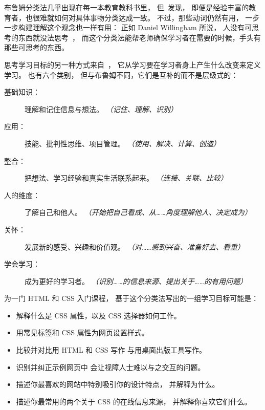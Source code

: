 布鲁姆分类法几乎出现在每一本教育教科书里，
但~\cite{Masa2018}发现，
即便是经验丰富的教育者，也很难就如何对具体事物分类达成一致。
不过，那些动词仍然有用，
一步一步构建理解这个观念也一样有用：
正如 Daniel Willingham 所说，
人没有可思考的东西就没法思考~\cite{Will2010}，
而这个分类法能帮老师确保学习者在需要的时候，手头有那些可思考的东西。

思考学习目标的另一种方式来自~\cite{Fink2013}，
它从学习要在学习者身上产生什么改变来定义学习。
也有六个类别，
但与布鲁姆不同，它们是互补的而不是层级式的：

\begin{description}

\item[基础知识：]
  理解和记住信息与想法。
  \emph{（记住、理解、识别）}

\item[应用：]
  技能、批判性思维、项目管理。
  \emph{（使用、解决、计算、创造）}

\item[整合：]
  把想法、学习经验和真实生活联系起来。
  \emph{（连接、关联、比较）}

\item[人的维度：]
  了解自己和他人。
  \emph{（开始把自己看成、从……角度理解他人、决定成为）}

\item[关怀：]
  发展新的感受、兴趣和价值观。
  \emph{（对……感到兴奋、准备好去、看重）}

\item[学会学习：]
  成为更好的学习者。
  \emph{（识别……的信息来源、提出关于……的有用问题）}

\end{description}

为一门 HTML 和 CSS 入门课程，
基于这个分类法写出的一组学习目标可能是：

\begin{itemize}

\item
  解释什么是 CSS 属性，以及 CSS 选择器如何工作。

\item
  用常见标签和 CSS 属性为网页设置样式。

\item
  比较并对比用 HTML 和 CSS 写作
  与用桌面出版工具写作。

\item
  识别并纠正示例网页中
  会让视障人士难以与之交互的问题。

\item
  描述你最喜欢的网站中特别吸引你的设计特点，
  并解释为什么。

\item
  描述你最常用的两个关于 CSS 的在线信息来源，
  并解释你喜欢它们什么。

\end{itemize}

